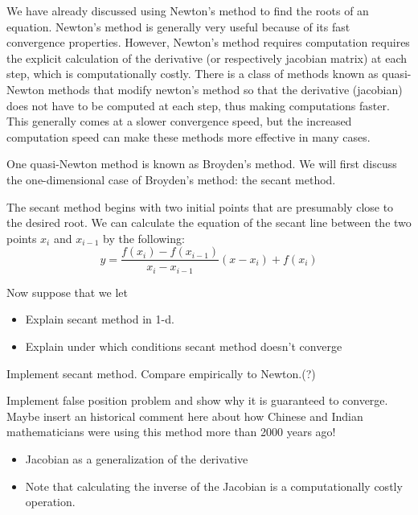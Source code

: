 

We have already discussed using Newton's method to find the roots of an equation. Newton's method is generally very useful because of its fast convergence properties. However, Newton's method requires computation requires the explicit calculation of the derivative (or respectively jacobian matrix) at each step, which is computationally costly. There is a class of methods known as quasi-Newton methods that modify newton's method so that the derivative (jacobian) does not have to be computed at each step, thus making computations faster. This generally comes at a slower convergence speed, but the increased computation speed can make these methods more effective in many cases.

One quasi-Newton method is known as Broyden's method. We will first discuss the one-dimensional case of Broyden's method: the secant method.

The secant method begins with two initial points that are presumably close to the desired root. We can calculate the equation of the secant line between the two points $x_i$ and $x_{i-1}$ by the following:
\[
y = \frac{f(x_i)-f(x_{i-1})}{x_i-x_{i-1}}(x-x_i) + f(x_i)
\]

Now suppose that we let 

\begin{itemize}
\item Explain secant method in 1-d.
\item Explain under which conditions secant method doesn't converge
\end{itemize}

\begin{problem}
Implement secant method.  Compare empirically to Newton.(?)
\end{problem}
\begin{problem}
Implement false position problem and show why it is guaranteed to converge.  Maybe insert an historical comment here about how Chinese and Indian mathematicians were using this method more than 2000 years ago!
\end{problem}

\begin{itemize}
\item Jacobian as a generalization of the derivative
\item Note that calculating the inverse of the Jacobian is a computationally costly operation.
\end{itemize}

